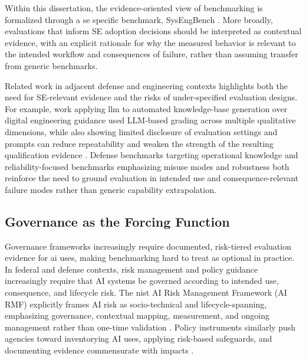 Within this dissertation, the evidence-oriented view of benchmarking is formalized through a \ac{se} specific benchmark, SysEngBench \cite{bell_IntroducingSysEngBenchNovel_2024, bell_RabellSysEngBenchDatasets_2024, Bell2025SysEngBench}.  More broadly, evaluations that inform SE adoption decisions should be interpreted as contextual evidence, with an explicit rationale for why the measured behavior is relevant to the intended workflow and consequences of failure, rather than assuming transfer from generic benchmarks. 

Related work in adjacent defense and engineering contexts highlights both the need for SE-relevant evidence and the risks of under-specified evaluation designs. For example, work applying \ac{llm} to automated knowledge-base generation over digital engineering guidance used LLM-based grading across multiple qualitative dimensions, while also showing limited disclosure of evaluation settings and prompts can reduce repeatability and weaken the strength of the resulting qualification evidence \cite{Collard_Automated_Knowledge_Base_Generation_Open_Source_LLMs_RAG_2025}. Defense benchmarks targeting operational knowledge \cite{parham_JointStaffBench_2025} and reliability-focused benchmarks emphasizing misuse modes and robustness \cite{hu_UseMisusePreTrained_2024} both reinforce the need to ground evaluation in intended use and consequence-relevant failure modes rather than generic capability extrapolation. 


\subsection{Governance as the Forcing Function}
\label{subsec:governance_forcing_function}

 
Governance frameworks increasingly require documented, risk-tiered evaluation evidence for \ac{ai} uses, making benchmarking hard to treat as optional in practice. In federal and defense contexts, risk management and policy guidance increasingly require that AI systems be governed according to intended use, consequence, and lifecycle risk. The \ac{nist} AI Risk Management Framework (AI RMF) explicitly frames AI risk as socio-technical and lifecycle-spanning, emphasizing governance, contextual mapping, measurement, and ongoing management rather than one-time validation \cite{NIST_ArtificialIntelligenceRisk_2023}. Policy instruments similarly push agencies toward inventorying AI uses, applying risk-based safeguards, and documenting evidence commensurate with impacts \cite{Office_of_Management_and_Budget_2024_M24-10_AI_Governance, Department_of_Homeland_Security_2023_AI_Acquisition_Use}.

